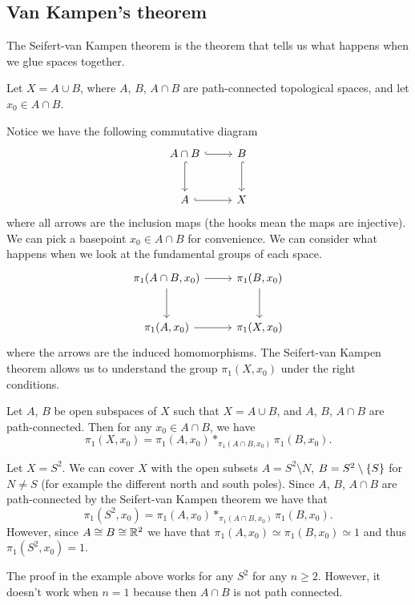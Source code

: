 \documentclass[11pt,a4paper]{article}
\begin{document}
\subsection{Van Kampen's theorem}
The Seifert-van Kampen theorem is the theorem that tells us
what happens when we glue spaces together.

Let $X = A \cup B$, where $A$, $B$, $A \cap B$ are path-connected topological
spaces, and let $x_0 \in A \cap B$.
\begin{center}
\end{center}
Notice we have the following commutative diagram
\[
  \begin{tikzcd}[row sep=large]
    A \cap B \ar [r, hook] \ar[d, hook] & B\ar[d, hook] \\
    A \ar [r, hook] & X
  \end{tikzcd}
\]
where all arrows are the inclusion maps
(the hooks mean the maps are injective).
We can pick a basepoint $x_0 \in A \cap B$ for convenience.
We can consider what happens when we look at the fundamental groups
of each space.
\[
  \begin{tikzcd}[row sep=large]
    \pi_1(A \cap B, x_0) \ar[r] \ar[d] & \pi_1(B, x_0) \ar[d] \\
    \pi_1(A, x_0) \ar[r] & \pi_1(X, x_0)
  \end{tikzcd}
\]
where the arrows are the induced homomorphisms.
The Seifert-van Kampen theorem allows us to understand the group
$\pi_1(X, x_0)$ under the right conditions.

\begin{theorem}
  Let $A$, $B$ be open subspaces of $X$ such that
  $X = A \cup B$, and $A$, $B$, $A \cap B$ are path-connected.
  Then for any $x_0 \in A \cap B$,
  we have
  \[
    \pi_1(X,x_0) = \pi_1(A,x_0) *_{\pi_1(A \cap B,x_0)} \pi_1(B,x_0).
  \]
\end{theorem}

\begin{example}
  Let $X = S^2$.
  We can cover $X$ with the open subsets $A = S^2 \setminus {N}$,
  $B = S^2 \setminus \left\{S\right\}$ for $N \neq S$ (for example the different
  north and south poles).
  Since $A$, $B$, $A \cap B$ are path-connected by the Seifert-van Kampen
  theorem we have that
  \[
    \pi_1(S^2,x_0) =
    \pi_1(A,x_0) *_{\pi_1(A \cap B,x_0)} \pi_1(B,x_0).
  \]
  However, since $A \cong B \cong \mathbb{R}^2$ we have that
  $\pi_1(A,x_0) \simeq \pi_1(B,x_0) \simeq 1$ and thus
  $\pi_1(S^2,x_0) = 1$.
\end{example}
\begin{remark}
  The proof in the example above works for any $S^2$ for any $n \geq 2$.
  However, it doesn't work when $n = 1$ because then $A \cap B$ is not
  path connected.
\end{remark}
\end{document}
